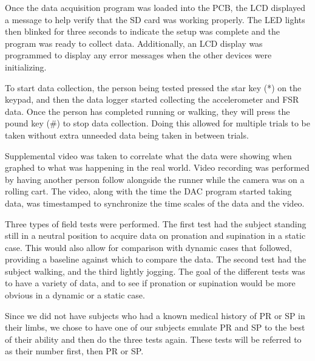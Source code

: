 Once the data acquisition program was loaded into the PCB, the LCD displayed a message to help verify that the SD card was working properly.
The LED lights then blinked for three seconds to indicate the setup was complete and the program was ready to collect data.
Additionally, an LCD display was programmed to display any error messages when the other devices were initializing.\par

To start data collection, the person being tested pressed the star key (*) on the keypad, and then the data logger started collecting the accelerometer and FSR data.
Once the person has completed running or walking, they will press the pound key (\#) to stop data collection.
Doing this allowed for multiple trials to be taken without extra unneeded data being taken in between trials.\par

Supplemental video was taken to correlate what the data were showing when graphed to what was happening in the real world.
Video recording was performed by having another person follow alongside the runner while the camera was on a rolling cart.
The video, along with the time the DAC program started taking data, was timestamped to synchronize the time scales of the data and the video.\par

Three types of field tests were performed.
The first test had the subject standing still in a neutral position to acquire data on pronation and supination in a static case.
This would also allow for comparison with dynamic cases that followed, providing a baseline against which to compare the data.
The second test had the subject walking, and the third lightly jogging.
The goal of the different tests was to have a variety of data, and to see if pronation or supination would be more obvious in a dynamic or a static case.\par

Since we did not have subjects who had a known medical history of PR or SP in their limbs, we chose to have one of our subjects emulate PR and SP to the best of their ability and then do the three tests again.
These tests will be referred to as their number first, then PR or SP.
